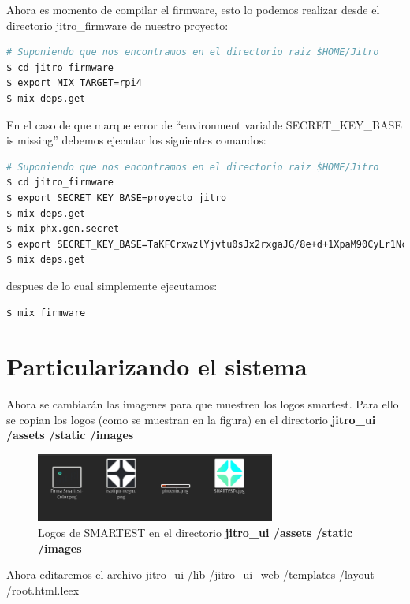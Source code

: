 Ahora es momento de compilar el firmware, esto lo podemos realizar desde el directorio jitro\_firmware de nuestro proyecto:

\begin{lstlisting}[language=bash]
# Suponiendo que nos encontramos en el directorio raiz $HOME/Jitro
$ cd jitro_firmware
$ export MIX_TARGET=rpi4
$ mix deps.get
\end{lstlisting}

\begin{note}
En el caso de que marque error de ``environment variable SECRET\_KEY\_BASE is missing'' debemos ejecutar los siguientes comandos:
\begin{lstlisting}[language=bash]
# Suponiendo que nos encontramos en el directorio raiz $HOME/Jitro
$ cd jitro_firmware
$ export SECRET_KEY_BASE=proyecto_jitro
$ mix deps.get
$ mix phx.gen.secret
$ export SECRET_KEY_BASE=TaKFCrxwzlYjvtu0sJx2rxgaJG/8e+d+1XpaM90CyLr1NcJpEtmrqbeLcV2/+xVc (resultado del comando anterior)
$ mix deps.get
\end{lstlisting}
\end{note}

despues de lo cual simplemente ejecutamos:

\begin{lstlisting}[language=bash]
$ mix firmware
\end{lstlisting}


\section{Particularizando el sistema}

Ahora se cambiarán las imagenes para que muestren los logos smartest. Para ello se copian los logos (como se muestran en la figura) en el directorio \textbf{jitro\_ui /assets /static /images}

\begin{figure}[htb]
\centering
\includegraphics[width=0.7\textwidth]{capitulo2/imagenes.png}
\caption{Logos de SMARTEST en el directorio \textbf{jitro\_ui /assets /static /images}}
\label{cap2:002}
\end{figure}

Ahora editaremos el archivo jitro\_ui /lib /jitro\_ui\_web /templates /layout /root.html.leex

